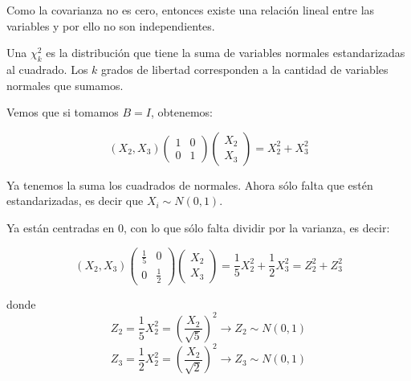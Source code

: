 \begin{problem}[2]
Como la covarianza no es cero, entonces existe una relación lineal entre las variables y por ello no son independientes.

\spart 

Una $\chi^2_k$ es la distribución que tiene la suma de variables normales estandarizadas al cuadrado. Los $k$ grados de libertad corresponden a la cantidad de variables normales que sumamos.

Vemos que si tomamos $B=I$, obtenemos:

\[(X_2,X_3) \begin{pmatrix} 1&0\\0&1 \end{pmatrix} \begin{pmatrix}X_2\\X_3\end{pmatrix} = X_2^2 + X_3^2\]

Ya tenemos la suma los cuadrados de normales. Ahora sólo falta que estén estandarizadas, es decir que $X_i \sim N(0,1)$.

Ya están centradas en 0, con lo que sólo falta dividir por la varianza, es decir:

\[(X_2,X_3) \begin{pmatrix} \frac{1}{5}&0\\0&\frac{1}{2} \end{pmatrix} \begin{pmatrix}X_2\\X_3\end{pmatrix} = \frac{1}{5}X_2^2 + \frac{1}{2}X_3^2 = Z_2^2 + Z_3^2\]

donde 
\[Z_2 = \frac{1}{5}X_2^2 = \left(\frac{X_2}{\sqrt{5}}\right)^2 \to Z_2 \sim N(0,1)\]
\[Z_3 = \frac{1}{2}X_2^2 = \left(\frac{X_2}{\sqrt{2}}\right)^2 \to Z_3 \sim N(0,1)\]


\end{problem}
